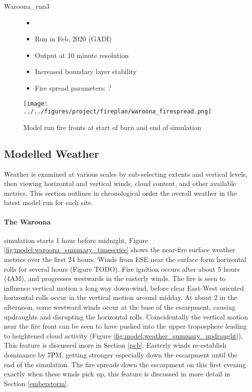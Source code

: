 \begin{description}
      \item [Waroona\_run3]
      \begin{itemize}
        \item []
        \item Run in Feb, 2020 (GADI)
        \item Output at 10 minute resolution
        \item Increased boundary layer stability
        \item Fire spread parameters: ?
      \end{itemize}
    \end{description}
    
    \begin{figure}
      \texttt{[image: ../../figures/project/fireplan/waroona\_firespread.png]}
      \caption{Model run fire fronts at start of burn and end of simulation}
      \label{fig:model:firespread_waroona}
    \end{figure}
    
    
    
  \subsection{Modelled Weather}
    \label{model:weather_summary}
    
    Weather is examined at various scales by sub-selecting extents and vertical levels, then viewing horizontal and vertical winds, cloud content, and other available metrics. This section outlines in chronological order the overall weather in the latest model run for each site.
    
    \paragraph{The Waroona} simulation starts 1 hour before midnight, Figure \ref{fig:model:waroona_summary_timeseries} shows the near-fire surface weather metrics over the first 24 hours.
    Winds from ESE near the surface form horizontal rolls for several hours (Figure TODO). Fire ignition occurs after about 5 hours (4AM), and progresses westwards in the easterly winds. 
    The fire is seen to influence vertical motion a long way down-wind, before clear East-West oriented horizontal rolls occur in the vertical motion around midday. 
    At about 2 in the afternoon, some westward winds occur at the base of the escarpment, causing updraughts and disrupting the horizontal rolls.
    Coincidentally the vertical motion near the fire front can be seen to have pushed into the upper troposphere leading to heightened cloud activity (Figure \ref{fig:model:weather_summary_updraught}), This feature is discussed more in Section \ref{pcb}.
    Easterly winds re-establish dominance by 7PM, getting stronger especially down the escarpment until the end of the simulation.
    The fire spreads down the escarpment on this first evening exactly when these winds pick up, this feature is discussed in more detail in Section \ref{emberstorm}.
    
